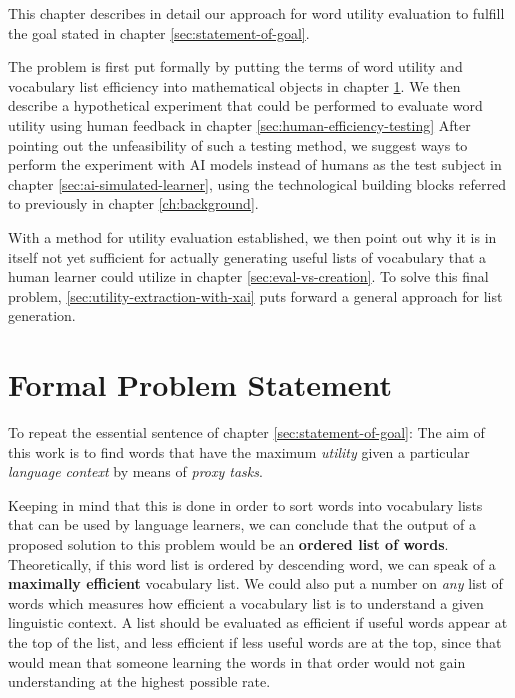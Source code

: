 This chapter describes in detail our approach for word utility evaluation to fulfill the goal stated in chapter \ref{sec:statement-of-goal}.

The problem is first put formally by putting the terms of word utility and vocabulary list efficiency into mathematical objects in chapter \ref{sec:formal-problem-statement}.
We then describe a hypothetical experiment that could be performed to evaluate word utility using human feedback in chapter \ref{sec:human-efficiency-testing}
After pointing out the unfeasibility of such a testing method, we suggest ways to perform the experiment with AI models instead of humans as the test subject in chapter \ref{sec:ai-simulated-learner}, using the technological building blocks referred to previously in chapter \ref{ch:background}.

With a method for utility evaluation established, we then point out why it is in itself not yet sufficient for actually generating useful lists of vocabulary that a human learner could utilize in chapter \ref{sec:eval-vs-creation}.
To solve this final problem, \ref{sec:utility-extraction-with-xai} puts forward a general approach for list generation.

\section{Formal Problem Statement} \label{sec:formal-problem-statement}


To repeat the essential sentence of chapter \ref{sec:statement-of-goal}:
The aim of this work is to find words that have the maximum \textit{utility} given a particular \textit{language context} by means of \textit{proxy tasks}.

Keeping in mind that this is done in order to sort words into vocabulary lists that can be used by language learners, we can conclude that the output of a proposed solution to this problem would be an \textbf{ordered list of words}.
Theoretically, if this word list is ordered by descending word, we can speak of a \textbf{maximally efficient} vocabulary list.
We could also put a number on \textit{any} list of words which measures how efficient a vocabulary list is to understand a given linguistic context.
A list should be evaluated as efficient if useful words appear at the top of the list, and less efficient if less useful words are at the top, since that would mean that someone learning the words in that order would not gain understanding at the highest possible rate.

